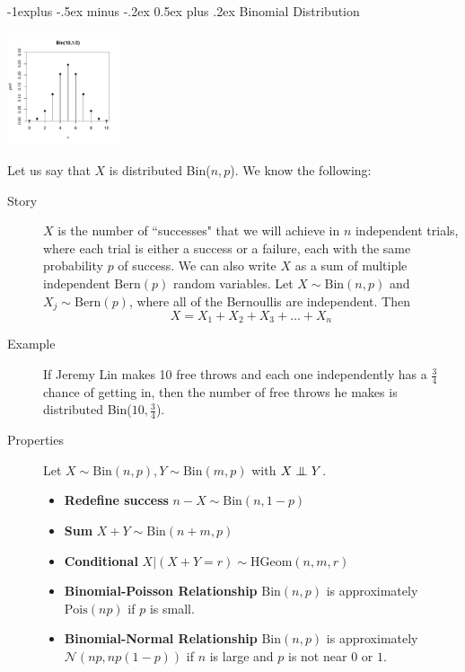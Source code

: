 \documentclass[6pt, landscape]{article}
\makeatletter
\renewcommand{\subsection}{\@startsection{subsection}{2}{0mm}%
                                {-1explus -.5ex minus -.2ex}%
                                {0.5ex plus .2ex}%
                                {\small\bfseries}}
\renewcommand{\N}{\mathcal{N}}
\newcommand{\Bern}{\textrm{Bern}}
\newcommand{\Bin}{\textrm{Bin}}
\newcommand{\Pois}{\textrm{Pois}}
\newcommand{\HGeom}{\textrm{HGeom}}
\newcommand\independent{\protect\mathpalette{\protect\independenT}{\perp}}
\def\independenT#1#2{\mathrel{\setbox0\hbox{$#1#2$}%
    \copy0\kern-\wd0\mkern4mu\box0}}
\makeatother
\begin{document}
\begin{multicols}{3}
        \subsection{Binomial Distribution}
        \begin{minipage}{\linewidth}
                \centering
                \includegraphics[width=1.3in]{figures/Bin10_05.pdf}
        \end{minipage}

        Let us say that $X$ is distributed \Bin($n,p$). We know the following:
        \begin{description}
                \item[Story] $X$ is the number of ``successes" that we will achieve in $n$ independent trials, where each trial is either a success or a failure, each with the same probability $p$ of success. We can also write $X$ as a sum of multiple independent $\Bern(p)$ random variables. Let $X \sim \Bin(n, p)$ and $X_j \sim \Bern(p)$, where all of the Bernoullis are independent. Then
                      \[X = X_1 + X_2 + X_3 + \dots + X_n\]
                \item[Example] If Jeremy Lin makes 10 free throws and each one independently has a $\frac{3}{4}$ chance of getting in, then the number of free throws he makes is distributed  \Bin($10,\frac{3}{4}$).
                \item[Properties] Let $X \sim \Bin(n,p), Y \sim \Bin(m,p)$ with $X \independent Y$.
                      \begin{itemize}
                              \item \textbf{Redefine success} $n-X \sim \Bin(n,1-p)$
                              \item \textbf{Sum} $X+Y \sim \Bin(n+m,p)$
                              \item \textbf{Conditional} $X|(X+Y=r) \sim \HGeom(n,m,r)$
                              \item \textbf{Binomial-Poisson Relationship} $\Bin(n, p)$ is approximately  $\Pois(np)$ if $p$ is small.
                              \item \textbf{Binomial-Normal Relationship} $\Bin(n, p)$ is approximately $\N(np,np(1-p))$ if $n$ is large and $p$ is not near $0$ or $1$.
                      \end{itemize}
        \end{description}


\end{multicols}
\end{document}
